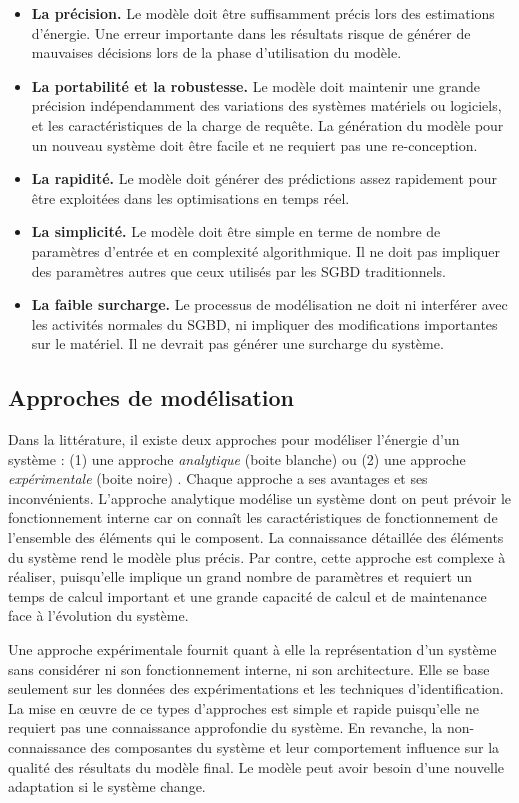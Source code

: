 \begin{itemize}
 \item \textbf{La précision.} Le modèle doit être suffisamment précis lors des estimations d'énergie. Une erreur importante dans les résultats risque de générer de mauvaises décisions lors de la phase d'utilisation du modèle.
 \item \textbf{La portabilité et la robustesse.} Le modèle doit maintenir une grande précision indépendamment des variations des systèmes matériels ou logiciels, et les caractéristiques de la charge de requête. La génération du modèle pour un nouveau système doit être facile et ne requiert pas une re-conception.
 \item \textbf{La rapidité.} Le modèle doit générer des prédictions assez rapidement pour être exploitées dans les optimisations en temps réel.
 \item \textbf{La simplicité.} Le modèle doit être simple en terme de nombre de paramètres d'entrée et en complexité algorithmique. Il ne doit pas impliquer des paramètres autres que ceux utilisés par les SGBD traditionnels. 
 \item \textbf{La faible surcharge.} Le processus de modélisation ne doit ni interférer avec les activités normales du SGBD, ni impliquer des modifications importantes sur le matériel. Il ne devrait pas générer une surcharge du système.
\end{itemize}

\subsection{Approches de modélisation}
Dans la littérature, il existe deux approches pour modéliser l'énergie d'un système : (1) une approche \textit{analytique} (boite blanche) ou (2) une approche \textit{expérimentale} (boite noire) \cite{Rivoire08}. Chaque approche a ses avantages et ses inconvénients. L'approche analytique modélise un système dont on peut prévoir le fonctionnement interne car on connaît les caractéristiques de fonctionnement de l'ensemble des éléments qui le composent. La connaissance détaillée des éléments du système rend le modèle plus précis. Par contre, cette approche est complexe à réaliser, puisqu'elle implique un grand nombre de paramètres et requiert un temps de calcul important et une grande capacité de calcul et de maintenance face à l'évolution du système.

Une approche expérimentale fournit quant à elle la représentation d'un système sans considérer ni son fonctionnement interne, ni son architecture. Elle se base seulement sur les données des expérimentations et les techniques d'identification. La mise en œuvre de ce types d'approches est simple et rapide puisqu'elle ne requiert pas une connaissance approfondie du système. En revanche, la non-connaissance des composantes du système et leur comportement influence sur la qualité des résultats du modèle final. Le modèle peut avoir besoin d'une nouvelle adaptation si le système change.

